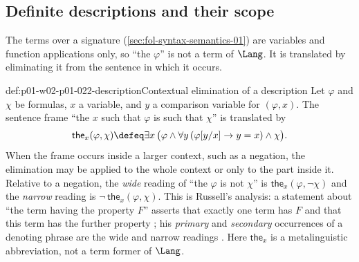 \subsection{Definite descriptions and their scope}
\label{sec:p01-w02-p01-022-descriptions}

The terms over a signature (\cref{sec:fol-syntax-semantics-01}) are
variables and function applications only, so ``the \(\varphi\)'' is not a
term of \(\Lang\). It is
translated by eliminating it from the sentence in which it occurs.

\begin{hbdefinition}{def:p01-w02-p01-022-description}{Contextual elimination of a description}
Let \(\varphi\) and \(\chi\) be formulas, \(x\) a variable, and \(y\) a
comparison variable for \((\varphi,x)\). The sentence frame ``the
\(x\) such that \(\varphi\) is such that \(\chi\)'' is translated by
\[
  \mathsf{the}_x(\varphi,\chi)\defeq
  \exists x\,\bigl(\varphi\land\forall y\,(\varphi[y/x]\to y=x)\land\chi\bigr).
\]
When the frame occurs inside a larger context, such as a negation, the
elimination may be applied to the whole context or only to the part inside
it. Relative to a negation, the \emph{wide} reading of ``the \(\varphi\) is
not \(\chi\)'' is \(\mathsf{the}_x(\varphi,\neg\chi)\) and the \emph{narrow}
reading is \(\neg\,\mathsf{the}_x(\varphi,\chi)\). This is Russell's
analysis: a statement about ``the term having the property \(F\)'' asserts
that exactly one term has \(F\) and that this term has the further property
\cite[481--482, 490]{Russell1905}; his \emph{primary} and \emph{secondary}
occurrences of a denoting phrase are the wide and narrow readings
\cite[489--490]{Russell1905}. Here \(\mathsf{the}_x\) is a metalinguistic
abbreviation, not a term former of \(\Lang\).
\end{hbdefinition}

